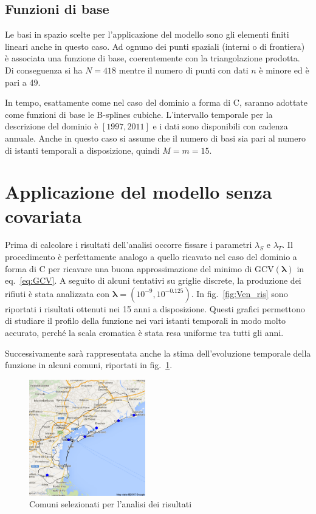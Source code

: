 \documentclass[a4paper,11pt,twoside,openright]{book}							%
\begin{document}
\subsection{Funzioni di base}
Le basi in spazio scelte per l'applicazione del modello sono gli elementi finiti lineari anche in questo caso. Ad ognuno dei punti spaziali (interni o di frontiera) è associata una funzione di base, coerentemente con la triangolazione prodotta. Di conseguenza si ha $N=418$ mentre il numero di punti con dati $n$ è minore ed è pari a 49.

In tempo, esattamente come nel caso del dominio a forma di C, saranno adottate come funzioni di base le B-splines cubiche. L'intervallo temporale per la descrizione del dominio è $[1997,2011]$ e i dati sono disponibili con cadenza annuale. Anche in questo caso si assume che il numero di basi sia pari al numero di istanti temporali a disposizione, quindi $M=m=15$.

\section{Applicazione del modello senza covariata}

Prima di calcolare i risultati dell'analisi occorre fissare i parametri $\lambda_S$ e $\lambda_T$. Il procedimento è perfettamente analogo a quello ricavato nel caso del dominio a forma di C per ricavare una buona approssimazione del minimo di $\mathrm{GCV}(\bm \lambda)$ in eq.~\eqref{eq:GCV}. A seguito di alcuni tentativi su griglie discrete, la produzione dei rifiuti è stata analizzata con $\bm \lambda = (10^{-9}, 10^{-0.125})$. In fig.~\ref{fig:Ven_ris} sono riportati i risultati ottenuti nei 15 anni a disposizione. Questi grafici permettono di studiare il profilo della funzione nei vari istanti temporali in modo molto accurato, perché la scala cromatica è stata resa uniforme tra tutti gli anni.

Successivamente sarà rappresentata anche la stima dell'evoluzione temporale della funzione in alcuni comuni, riportati in fig.~\ref{fig:Ven_selected}.
\newline
\newline
\newline
\newline
\newline
\begin{figure}[h]
	\centering
	\includegraphics[width=0.45\textwidth]{Immagini/comuni_selezionati.png}   
   \caption{Comuni selezionati per l'analisi dei risultati}
	\label{fig:Ven_selected}
\end{figure}
\end{document}
